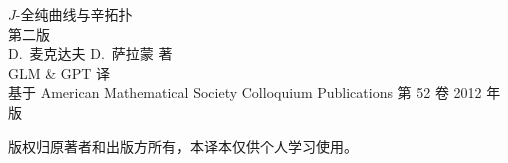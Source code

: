 \documentclass[UTF8,scheme=plain,fontset=windows,openany,11pt]{ctexbook}
\begin{document}
\frontmatter

\begin{titlepage}
  \centering
  \vspace*{3cm}
  {\heiti $J$-全纯曲线与辛拓扑}\\[1.2cm]
  {\heiti 第二版}\\[3cm]
  { D.~麦克达夫 \quad D.~萨拉蒙 著}\\[0.6cm]
  { GLM \& GPT 译}\\[0.6cm]
  { 基于 American Mathematical Society Colloquium Publications
   第 52 卷 2012 年版}\\[4cm]
  \begin{minipage}{0.8\textwidth}\small
    版权归原著者和出版方所有，本译本仅供个人学习使用。
  \end{minipage}
  \vfill
\end{titlepage}

\tableofcontents



\mainmatter
\BookIndexingtrue


\BookIndexingfalse
\backmatter







\end{document}
